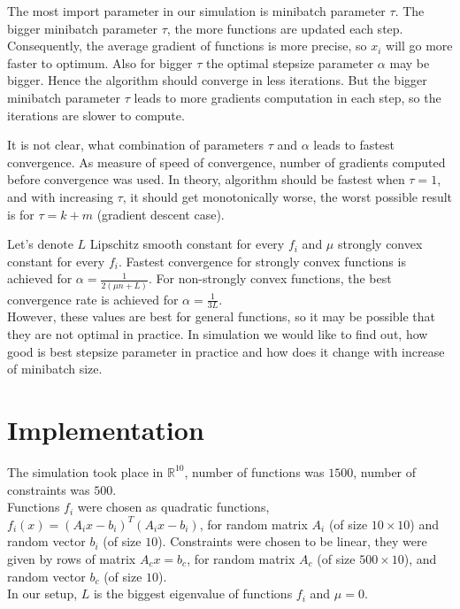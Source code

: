 \documentclass[11pt]{book}
\newcommand{\R}{\mathbb{R}}
\begin{document}
The most import parameter in our simulation is minibatch parameter $\tau$. The bigger minibatch parameter $\tau$, the more functions are updated each step. Consequently, the average gradient of functions is more precise, so $x_i$ will go more faster to optimum. Also for bigger $\tau$ the optimal stepsize parameter $\alpha$ may be bigger. Hence the algorithm should converge in less iterations. But the bigger minibatch parameter $\tau$ leads to more gradients computation in each step, so the iterations are slower to compute.

It is not clear, what combination of parameters $\tau$ and $\alpha$ leads to fastest convergence. As measure of speed of convergence, number of gradients computed before convergence was used. In theory, algorithm should be fastest when $\tau=1$, and with increasing $\tau$, it should get monotonically worse, the worst possible result is for $\tau = k+m$ (gradient descent case).

Let's denote $L$ Lipschitz smooth constant for every $f_i$ and $\mu$ strongly convex constant for every $f_i$. Fastest convergence for strongly convex functions is achieved for $\alpha = \frac{1}{2(\mu n + L)}$. For non-strongly convex functions, the best convergence rate is achieved for $\alpha = \frac{1}{3L}$.\\

However, these values are best for general functions, so it may be possible that they are not optimal in practice. In simulation we would like to find out, how good is best stepsize parameter in practice and how does it change with increase of minibatch size.


\section{Implementation}

The simulation took place in $\R^{10}$, number of functions was $1500$, number of constraints was $500$.\\

Functions $f_i$ were chosen as quadratic functions, $f_i(x) = (A_ix-b_i)^T(A_ix-b_i)$, for random matrix $A_i$ (of size $10 \times 10$) and random vector $b_i$ (of size $10$). Constraints were chosen to be linear, they were given by rows of matrix $A_cx=b_c$, for random matrix $A_c$ (of size $500 \times 10$), and random vector $b_c$ (of size $10$).\\

In our setup, $L$ is the biggest eigenvalue of functions $f_i$ and $\mu=0$.
\end{document}
